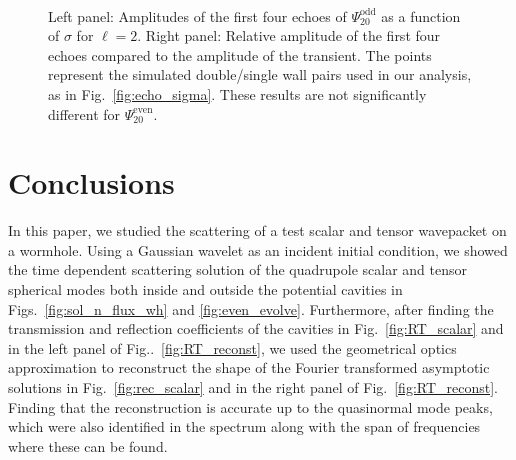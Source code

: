 \documentclass[article,aps,nofootinbib,twocolumn,superscriptaddress]{revtex4-1}
\begin{document}
\begin{figure}
\centering
{} \,
\caption{\label{fig:echo_sigma_odd} Left panel: Amplitudes of the first four echoes of $\Psi^{\mathrm{odd}}_{20}$ as a function of $\sigma$ for $\ell=2$. Right panel: Relative amplitude of the first four echoes compared to the amplitude of the transient. The points represent the simulated double/single wall pairs used in our analysis, as in Fig.~\ref{fig:echo_sigma}. These results are not significantly different for $\Psi^{\mathrm{even}}_{20}$.} 
\end{figure}
\section{Conclusions}\label{sec:conclusions}
In this paper, we studied the scattering of a test scalar and tensor wavepacket on a wormhole. Using a Gaussian wavelet as an incident initial condition, we showed the time dependent scattering solution of the quadrupole scalar and tensor spherical modes both inside and outside the potential cavities in Figs.~\ref{fig:sol_n_flux_wh} and \ref{fig:even_evolve}. Furthermore, after finding the transmission and reflection coefficients of the cavities in Fig.~\ref{fig:RT_scalar} and in the left panel of Fig..~\ref{fig:RT_reconst}, we used the geometrical optics approximation to reconstruct the shape of the Fourier transformed asymptotic solutions in Fig.~\ref{fig:rec_scalar} and in the right panel of Fig.~\ref{fig:RT_reconst}. Finding that the reconstruction is accurate up to the quasinormal mode peaks, which were also identified in the spectrum along with the span of frequencies where these can be found. 
\end{document}

